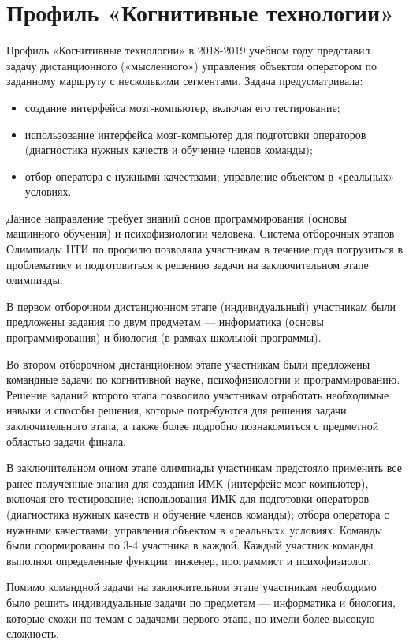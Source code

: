 

\chapter{Профиль «Когнитивные технологии»}

Профиль «Когнитивные технологии» в 2018-2019 учебном году представил задачу дистанционного («мысленного») управления объектом оператором по заданному маршруту с несколькими сегментами. Задача предусматривала: 
\begin{itemize}
\item создание интерфейса мозг-компьютер, включая его тестирование; 
\item использование интерфейса мозг-компьютер для подготовки операторов (диагностика нужных качеств и обучение членов команды); 
\item отбор оператора с нужными качествами; управление объектом в «реальных» условиях. 
\end{itemize}

Данное направление требует знаний основ программирования  (основы машинного обучения) и психофизиологии человека. Система отборочных этапов Олимпиады НТИ по профилю позволяла участникам в течение года погрузиться в проблематику и подготовиться к решению задачи на заключительном этапе олимпиады.

В первом отборочном дистанционном этапе (индивидуальный) участникам были предложены задания по двум предметам — информатика (основы программирования) и биология (в рамках школьной программы).

Во втором отборочном дистанционном этапе участникам были предложены командные задачи по когнитивной науке, психофизиологии и программированию. Решение заданий второго этапа позволило участникам отработать необходимые навыки и способы решения, которые потребуются для решения задачи заключительного этапа, а также более подробно познакомиться с предметной областью задачи финала.

В заключительном очном этапе олимпиады участникам предстояло применить все ранее полученные знания для создания ИМК (интерфейс мозг-компьютер), включая его тестирование;  	использования ИМК для подготовки операторов (диагностика нужных качеств и обучение членов команды);  	отбора оператора с нужными качествами;    управления объектом в «реальных» условиях. Команды были сформированы по 3-4 участника в каждой. Каждый участник команды выполнял  определенные функции: инженер, программист и психофизиолог. 

Помимо командной задачи на заключительном этапе участникам необходимо было решить индивидуальные задачи по предметам — информатика и биология, которые схожи по темам с задачами первого этапа, но имели более высокую сложность.